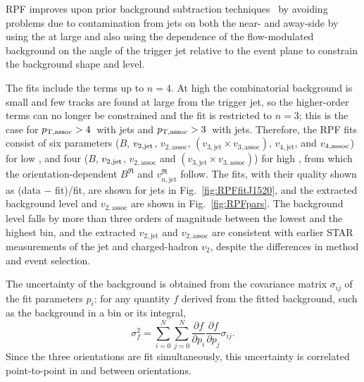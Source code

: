 RPF improves upon prior background subtraction techniques~\cite{PhysRevC.101.064901,Nattrass:2016cln} by avoiding problems due to contamination from jets on both the near- and away-side by using the \ns at large \deta and also using the dependence of the flow-modulated background on the angle of the trigger jet relative to the event plane to constrain the background shape and level. %

The fits include the terms up to $n = 4$.
%
At high  the combinatorial background is small and few tracks are found at large \deta from the trigger jet, so the higher-order terms can no longer be constrained and the fit is restricted to $n = 3$; this is the case for $p_{\mathrm{T, assoc}} > 4$~\GeVc with  jets and $p_{\mathrm{T, assoc}} > 3$~\GeVc with  jets.
%
Therefore, the RPF fits consist of six parameters ($B$, $v_{2, \rm jet}$, $v_{2, \mathrm {assoc}}$, $(v_{3, \mathrm {jet}}\times v_{3, \mathrm {assoc}})$, $v_{4, \mathrm {jet}}$, and $v_{4, \rm assoc}$) for low , and four ($B$, $v_{2, \rm jet}$, $v_{2, \mathrm {assoc}}$ and $(v_{3, \mathrm {jet}}\times v_{3, \mathrm {assoc}})$) for high , from which the orientation-dependent $B^\mathfrak{R}$ and $v^\mathfrak{R}_{n, \mathrm{jet}}$ follow.
%
The fits, with their quality shown as (data $-$ fit)/fit, are shown for  jets in Fig.~\ref{fig:RPFfitJ1520}, and the extracted background level and $v_{2,\mathrm{assoc}}$ are shown in Fig.~\ref{fig:RPFpars}.
%
The background level falls by more than three orders of magnitude between the lowest and the highest  bin, and the extracted $v_{2,\mathrm{jet}}$ and $v_{2,\mathrm{assoc}}$ are consistent with earlier STAR measurements of the jet and charged-hadron $v_2$, despite the differences in method and event selection.

The uncertainty of the background is obtained from the covariance matrix $\sigma_{ij}$ of the fit parameters $p_i$: for any quantity $f$ derived from the fitted background, such as the background in a \dphi bin or its integral,
%
\begin{equation}
	\sigma_f^2 = \sum_{i=0}^{N} \sum_{j=0}^{N} \frac{\partial f}{\partial p_i} \frac{\partial f}{\partial p_j} \sigma_{ij}.
	\label{eqn:CovProp}
\end{equation}
%
Since the three orientations are fit simultaneously, this uncertainty is correlated point-to-point in \dphi and between orientations.

